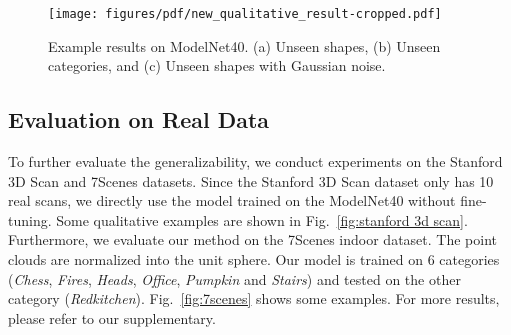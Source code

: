 \documentclass[10pt,twocolumn,letterpaper]{article}
\begin{document}
\begin{figure*}[t]
    \centering
    \texttt{[image: figures/pdf/new\_qualitative\_result-cropped.pdf]}\\
    \caption{Example results on ModelNet40. (a) Unseen shapes, (b) Unseen categories, and (c) Unseen shapes with Gaussian noise.}
    \vspace{-0.37cm}
    \label{fig:qualitative results}
\end{figure*} 

\subsection{Evaluation on Real Data} \label{sec:4.4}
To further evaluate the generalizability, we conduct experiments on the Stanford 3D Scan and 7Scenes datasets. Since the Stanford 3D Scan dataset only has 10 real scans, we directly use the model trained on the ModelNet40 without fine-tuning. Some qualitative examples are shown in Fig.~\ref{fig:stanford 3d scan}. Furthermore, we evaluate our method on the 7Scenes indoor dataset. The point clouds are normalized into the unit sphere. Our model is trained on 6 categories (\emph{Chess}, \emph{Fires}, \emph{Heads}, \emph{Office}, \emph{Pumpkin} and \emph{Stairs}) and tested on the other category (\emph{Redkitchen}). Fig.~\ref{fig:7scenes} shows some examples. For more results, please refer to our supplementary.
\end{document}
